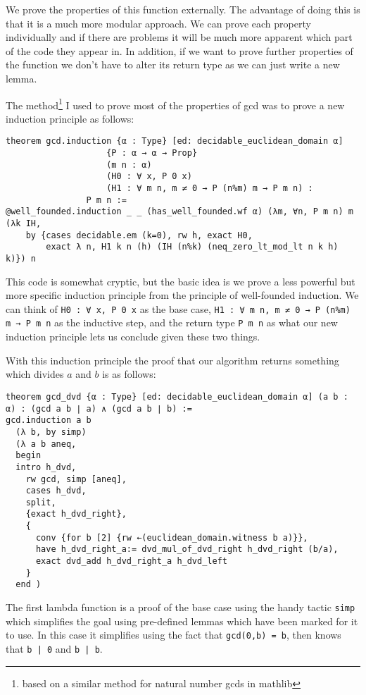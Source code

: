 \documentclass{article}
\newcommand{\ct}{\texttt}
\begin{document}
We prove the properties of this function externally. 
The advantage of doing this is that it is a much more modular approach.
We can prove each property individually and if there are problems it will be much more apparent which part of the code they appear in.
In addition, if we want to prove further properties of the function we don't have to alter its return type as we can just write a new lemma.

The method\footnote{based on a similar method for natural number gcds in mathlib} I used to prove most of the properties of gcd was to prove a new induction principle as follows:
\begin{lstlisting}
theorem gcd.induction {α : Type} [ed: decidable_euclidean_domain α] 
                    {P : α → α → Prop}
                    (m n : α)
                    (H0 : ∀ x, P 0 x)
                    (H1 : ∀ m n, m ≠ 0 → P (n%m) m → P m n) :
                P m n := 
@well_founded.induction _ _ (has_well_founded.wf α) (λm, ∀n, P m n) m (λk IH,
    by {cases decidable.em (k=0), rw h, exact H0,
        exact λ n, H1 k n (h) (IH (n%k) (neq_zero_lt_mod_lt n k h) k)}) n
\end{lstlisting}

This code is somewhat cryptic, but the basic idea is we prove a less powerful but more specific induction principle from the principle of well-founded induction.
We can think of \lstinline{H0 : ∀ x, P 0 x} as the base case, \lstinline{H1 : ∀ m n, m ≠ 0 → P (n%m) m → P m n} as the inductive step, and the return type \ct{P m n} as what our new induction principle lets us conclude given these two things.

With this induction principle the proof that our algorithm returns something which divides $a$ and $b$ is as follows:
\begin{lstlisting}
theorem gcd_dvd {α : Type} [ed: decidable_euclidean_domain α] (a b : α) : (gcd a b ∣ a) ∧ (gcd a b ∣ b) :=
gcd.induction a b
  (λ b, by simp)
  (λ a b aneq,
  begin
  intro h_dvd,
    rw gcd, simp [aneq],
    cases h_dvd,
    split,
    {exact h_dvd_right},
    {
      conv {for b [2] {rw ←(euclidean_domain.witness b a)}},
      have h_dvd_right_a:= dvd_mul_of_dvd_right h_dvd_right (b/a),
      exact dvd_add h_dvd_right_a h_dvd_left
    }
  end )
\end{lstlisting}
The first lambda function is a proof of the base case using the handy tactic \ct{simp} which simplifies the goal using pre-defined lemmas which have been marked for it to use. 
In this case it simplifies using the fact that \ct{gcd(0,b) = b}, then knows that \ct{b | 0} and \ct{b | b}.
\end{document}

